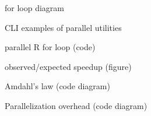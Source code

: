 
\begin{frame}
		for loop diagram
\end{frame}

\begin{frame}
		CLI examples of parallel utilities
\end{frame}

\begin{frame}
		parallel R for loop (code)
\end{frame}

\begin{frame}
		observed/expected speedup (figure)
\end{frame}

\begin{frame}
		Amdahl's law (code diagram)
\end{frame}

\begin{frame}
		Parallelization overhead (code diagram)
\end{frame}

